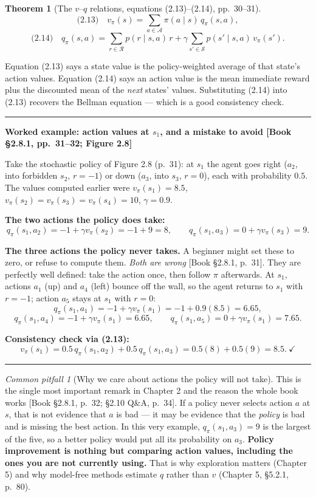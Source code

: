\documentclass[11pt, letterpaper]{article}
\theoremstyle{runin}
\theoremstyle{runinplain}
\newtheorem{theorem}{Theorem}[section]
\theoremstyle{remark}
\newtheorem*{warning}{Common pitfall}
\newcommand{\Sspace}{\mathcal{S}}
\newcommand{\Aspace}{\mathcal{A}}
\newcommand{\bkin}[1]{{\color{bookblue}\small[\textsf{Book #1}]}}
\newenvironment{worked}[1]
  {\par\medskip\noindent\rule{\textwidth}{0.4pt}\par\nobreak\vspace{0.3em}
   \noindent\textbf{Worked example: #1}\par\nobreak\vspace{0.2em}\small}
  {\par\nobreak\vspace{0.3em}\noindent\rule{\textwidth}{0.4pt}\par\medskip}
\begin{document}
\begin{theorem}[The $v$--$q$ relations, equations (2.13)--(2.14), pp.~30--31]
\[
  \text{(2.13)}\quad v_\pi(s)=\sum_{a\in\Aspace}\pi(a\mid s)\,q_\pi(s,a),
\]
\[
  \text{(2.14)}\quad q_\pi(s,a)=\sum_{r\in\mathcal R}p(r\mid s,a)\,r
    +\gamma\sum_{s'\in\Sspace}p(s'\mid s,a)\,v_\pi(s').
\]
\end{theorem}

Equation (2.13) says a state value is the policy-weighted average of that state's
action values. Equation (2.14) says an action value is the mean immediate reward
plus the discounted mean of the \emph{next} states' values. Substituting (2.14)
into (2.13) recovers the Bellman equation --- which is a good consistency check.

\begin{worked}{action values at $s_1$, and a mistake to avoid \bkin{\S2.8.1, pp.~31--32; Figure 2.8}}
Take the stochastic policy of Figure 2.8 (p.~31): at $s_1$ the agent goes right
($a_2$, into forbidden $s_2$, $r=-1$) or down ($a_3$, into $s_3$, $r=0$), each with
probability $0.5$. The values computed earlier were $v_\pi(s_1)=8.5$,
$v_\pi(s_2)=v_\pi(s_3)=v_\pi(s_4)=10$, $\gamma=0.9$.

\textbf{The two actions the policy does take:}
\[
  q_\pi(s_1,a_2)=-1+\gamma v_\pi(s_2)=-1+9=8,
  \qquad
  q_\pi(s_1,a_3)=0+\gamma v_\pi(s_3)=9.
\]

\textbf{The three actions the policy never takes.} A beginner might set these to
zero, or refuse to compute them. \emph{Both are wrong} \bkin{\S2.8.1, p.~31}. They
are perfectly well defined: take the action once, then follow $\pi$ afterwards.
At $s_1$, actions $a_1$ (up) and $a_4$ (left) bounce off the wall, so the agent
returns to $s_1$ with $r=-1$; action $a_5$ stays at $s_1$ with $r=0$:
\[
  q_\pi(s_1,a_1)=-1+\gamma v_\pi(s_1)=-1+0.9(8.5)=6.65,
\]
\[
  q_\pi(s_1,a_4)=-1+\gamma v_\pi(s_1)=6.65,
  \qquad
  q_\pi(s_1,a_5)=0+\gamma v_\pi(s_1)=7.65 .
\]

\textbf{Consistency check via (2.13):}
\[
  v_\pi(s_1)=0.5\,q_\pi(s_1,a_2)+0.5\,q_\pi(s_1,a_3)=0.5(8)+0.5(9)=8.5.\ \checkmark
\]
\end{worked}

\begin{warning}[Why we care about actions the policy will not take]
This is the single most important remark in Chapter 2 and the reason the whole
book works \bkin{\S2.8.1, p.~32; \S2.10 Q\&A, p.~34}. If a policy never selects
action $a$ at $s$, that is not evidence that $a$ is bad --- it may be evidence that
the \emph{policy} is bad and is missing the best action. In this very example,
$q_\pi(s_1,a_3)=9$ is the largest of the five, so a better policy would put all its
probability on $a_3$. \textbf{Policy improvement is nothing but comparing action
values, including the ones you are not currently using.} That is why exploration
matters (Chapter 5) and why model-free methods estimate $q$ rather than $v$
(Chapter 5, \S5.2.1, p.~80).
\end{warning}
\end{document}
